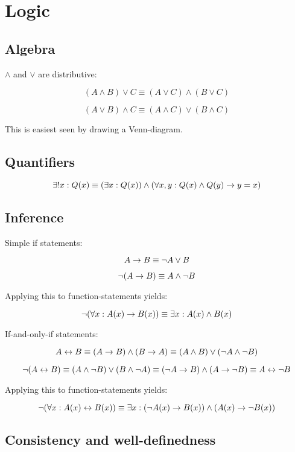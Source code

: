 \section{Logic}

\subsection{Algebra}

$\land$ and $\lor$ are distributive: 

$$ (A \land B) \lor C \equiv (A \lor C) \land (B \lor C)$$

$$ (A \lor B) \land C \equiv (A \land C) \lor (B \land C) $$

This is easiest seen by drawing a Venn-diagram. 

\subsection{Quantifiers}

$$ \exists ! x: Q(x) \equiv ( \exists x: Q(x) ) \land ( \forall x,y: Q(x) \land Q(y) \to y = x ) $$

\subsection{Inference}

Simple if statements: 

$$ A \to B \equiv \lnot A \lor B $$

$$ \lnot (A \to B) \equiv A \land \lnot B$$


Applying this to function-statements yields: 

$$ \lnot ( \forall x: A(x) \to B(x) ) \equiv \exists x: A(x) \land B(x)$$ 

If-and-only-if statements: 

$$ A \leftrightarrow B \equiv (A \to B) \land (B \to A) \equiv (A \land B) \lor (\lnot A \land \lnot B)$$

$$ \lnot (A \leftrightarrow B) \equiv (A \land \lnot B) \lor (B \land \lnot A) \equiv (\lnot A \to B) \land (A \to \lnot B) \equiv A \leftrightarrow \lnot B$$

Applying this to function-statements yields: 

$$ \lnot (\forall x : A(x) \leftrightarrow B(x)) \equiv \exists x : ( \lnot A(x) \to B(x) ) \land ( A(x) \to \lnot B(x) ) $$


\subsection{Consistency and well-definedness}

